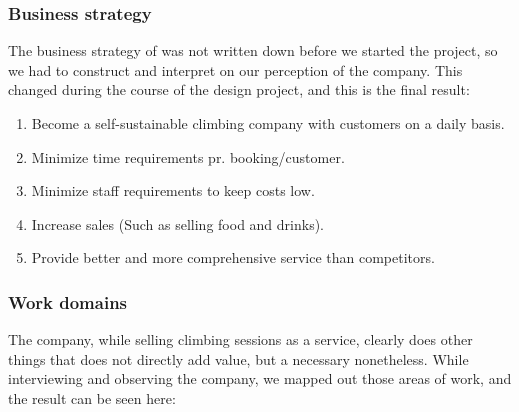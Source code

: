 \subsubsection{Business strategy}
The business strategy of \gomonkey{} was not written down before we started the
project, so we had to construct and interpret on our perception of the company.
This changed during the course of the design project, and this is the final 
result:

\begin{enumerate}
	\item Become a self-sustainable climbing company with customers on a daily basis.
	\item Minimize time requirements pr. booking/customer.
	\item Minimize staff requirements to keep costs low.
	\item Increase sales (Such as selling food and drinks).
	\item Provide better and more comprehensive service than competitors.
\end{enumerate}

\subsubsection{Work domains}
The company, while selling climbing sessions as a service, clearly does other
things that does not directly add value, but a necessary nonetheless.		%
While interviewing and observing the company, we mapped out those areas of 
work, and the result can be seen here:

